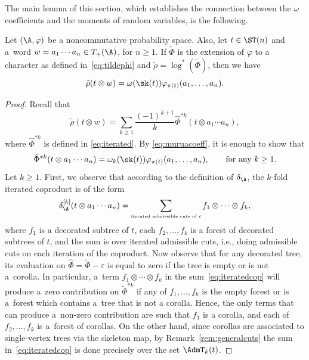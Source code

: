The main lemma of this section, which establishes the connection between the $\omega$ coefficients and the moments of random variables, is the following.

\begin{Lemma}
\label{lemma:main}
Let $(\A,\varphi)$ be a noncommutative probability space. Also, let $t \in \ST(n)$ and a~word $w=a_1\cdots a_n\in T_+(\A)$, for $n\geq1$. If $\tilde{\Phi}$ is the extension of $\varphi$ to a character as defined in~\eqref{eq:tildephi} and $\tilde\rho = \log^*(\tilde{\Phi})$, then we have
\begin{equation} \label{eq:tilderho10}
 \tilde\rho(t\otimes w) = \omega(\sk(t)) \varphi_{\pi(t)}(a_1,\dots,a_n).
\end{equation}
\end{Lemma}

\begin{proof}
Recall that
\[
	\tilde\rho(t\otimes w) = \sum_{k\geq 1} \frac{(-1)^{k+1}}{k} \hat\Phi^{*k} (t\otimes a_1\cdots a_n),
\]
where $\hat\Phi^{*k}$ is defined in \eqref{eq:iterated}. By \eqref{eq:muruacoeff}, it is enough to show that
\begin{equation}\label{eq:enough}
	\hat\Phi^{*k} (t\otimes a_1\cdots a_n) = \omega_k(\sk(t)) \varphi_{\pi(t)}(a_1,\dots,a_n),\qquad\mbox{for any }k\geq1.
\end{equation}
Let $k\geq 1$. First, we observe that according to the definition of $\delta_\A$, the $k$-fold iterated coproduct is of the form
\begin{equation}\label{eq:iteratedcop}
	\delta_\A^{[k]}(t\otimes a_1\cdots a_n) = \sum_{\mbox{\tiny{iterated admissible cuts of $t$}}}
	f_1\otimes\cdots \otimes f_k,
\end{equation}
where $f_1$ is a decorated subtree of $t$, each $f_2,\dots,f_k$ is a forest of decorated subtrees of $t$, and the sum is over iterated admissible cuts, i.e., doing admissible cuts on each iteration of the coproduct. Now observe that for any decorated tree, its evaluation on $\hat\Phi = \tilde\Phi - \varepsilon$ is equal to zero if the tree is empty or is not a~corolla. In particular, a~term $f_1\otimes\cdots \otimes f_k$ in the sum~\eqref{eq:iteratedcop} will produce a~zero contribution on $\tilde\Phi^{*k}$ if any of $f_1,\dots,f_k$ is the empty forest or is a~forest which contains a~tree that is not a corolla. Hence, the only terms that can produce a~non-zero contribution are such that $f_1$ is a corolla, and each of $f_2,\dots,f_k$ is a~forest of corollas. On the other hand, since corollas are associated to single-vertex trees via the skeleton map, by Remark~\ref{rem:generalcuts} the sum in~\eqref{eq:iteratedcop} is done precisely over the set $\AdmT_k(t)$.


\end{proof}
